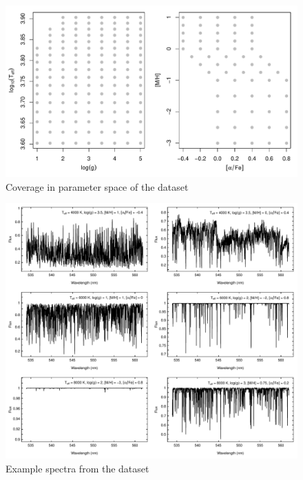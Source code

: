 \documentclass[a4paper,fleqn,usenatbib]{mnras}
\begin{document}
\begin{figure}
\centering\includegraphics[width=\columnwidth]{grid_modelos.pdf}
\caption{Coverage in parameter space of the dataset}
\label{fig:gridModelos}
\end{figure}

\begin{figure}
\centering\includegraphics[width=\textwidth]{espectros.pdf}
\caption{Example spectra from the dataset}
\label{fig:ejemplosEspectros}
\end{figure}
\end{document}
